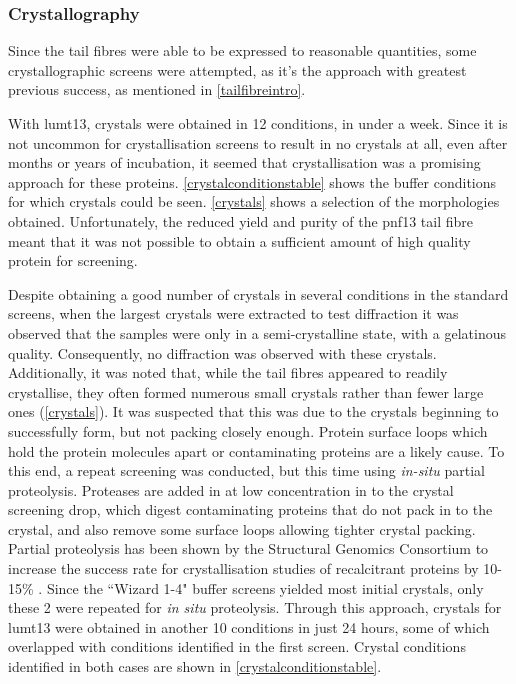 \subsubsection{Crystallography}
Since the tail fibres were able to be expressed to reasonable quantities, some crystallographic screens were attempted, as it's the approach with greatest previous success, as mentioned in \vref{tailfibreintro}.

With lumt13, crystals were obtained in 12 conditions, in under a week. Since it is not uncommon for crystallisation screens to result in no crystals at all, even after months or years of incubation, it seemed that crystallisation was a promising approach for these proteins. \vref{crystalconditionstable} shows the buffer conditions for which crystals could be seen. \vref{crystals} shows a selection of the morphologies obtained. Unfortunately, the reduced yield and purity of the pnf13 tail fibre meant that it was not possible to obtain a sufficient amount of high quality protein for screening.


Despite obtaining a good number of crystals in several conditions in the standard screens, when the largest crystals were extracted to test diffraction it was observed that the samples were only in a semi-crystalline state, with a gelatinous quality. Consequently, no diffraction was observed with these crystals. Additionally, it was noted that, while the tail fibres appeared to readily crystallise, they often formed numerous small crystals rather than fewer large ones (\vref{crystals}). It was suspected that this was due to the crystals beginning to successfully form, but not packing closely enough. Protein surface loops which hold the protein molecules apart or contaminating proteins are a likely cause. To this end, a repeat screening was conducted, but this time using \emph{in-situ} partial proteolysis. Proteases are added in at low concentration in to the crystal screening drop, which digest contaminating proteins that do not pack in to the crystal, and also remove some surface loops allowing tighter crystal packing. Partial proteolysis has been shown by the Structural Genomics Consortium to increase the success rate for crystallisation studies of recalcitrant proteins by 10-15\% \citep{Dong2007a, Wernimont2009}. Since the ``Wizard 1-4" buffer screens yielded most initial crystals, only these 2 were repeated for \emph{in situ} proteolysis. Through this approach, crystals for lumt13 were obtained in another 10 conditions in just 24 hours, some of which overlapped with conditions identified in the first screen. Crystal conditions identified in both cases are shown in \vref{crystalconditionstable}.

